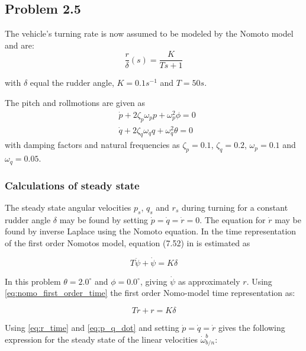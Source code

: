 \subsection*{Problem 2.5}

The vehicle's turning rate is now assumed to be modeled by the Nomoto model and are:
\begin{equation}
	\frac{r}{\delta} (s) = \frac{K}{Ts+1}
\end{equation}

with $\delta$ equal the rudder angle, $K =0.1 s^{-1}$ and $T = 50s$.

The pitch and rollmotions are given as
\begin{equation}
\begin{aligned}
	&\dot{p} + 2\zeta_p\omega_p p + \omega_p^2 \phi = 0\\
	&\dot{q} + 2\zeta_q\omega_q q + \omega_q^2 \theta = 0
	\label{eq:p_q_dot}
\end{aligned}
\end{equation}
with damping factors and natural  frequencies as $\zeta_p = 0.1 $, $\zeta_q = 0.2 $, $\omega_p = 0.1 $ and $\omega_q = 0.05 $. 

\subsubsection*{Calculations of steady state}

The steady state angular velocities $p_s$, $q_s$ and $r_s$ during turning for a constant rudder angle $\delta$ may be found by setting $\dot{p}= \dot{q} = \dot{r} = 0$. The equation for $\dot{r}$ may be found by inverse Laplace using the Nomoto equation. In \cite{Fossen2011} the time representation of the first order Nomotos model, equation (7.52) in \cite{Fossen2011} is estimated as 

\begin{equation}
    T \ddot{\psi} + \dot{\psi} = K \delta
    \label{eq:nomo_first_order_time}
\end{equation}

In this problem $\theta = 2.0 ^\circ$ and $\phi = 0.0 ^\circ$, giving $\dot{\psi}$ as approximately $r$. Using \eqref{eq:nomo_first_order_time} the  first order Nomo-model time representation as:

\begin{equation}
    T \dot{r} + r = K \delta
    \label{eq:r_time}
\end{equation}

Using \eqref{eq:r_time} and \eqref{eq:p_q_dot} and setting $\dot{p} =\dot{q} = \dot{r}$ gives the following expression for the steady state of the linear velocities $\dot{\omega}^b_{b/n}$:


